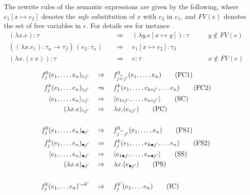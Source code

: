 \begin{definition}
The rewrite rules of the semantic expressions are given by the following, where $e_1[x \mapsto e_2]$ denotes the \emph{safe} substitution of $x$ with $e_2$ in $e_1$, and $\mathit{FV}(e)$ denotes the set of free variables in $e$. For details see for instance \cite{typedLambda}.
\begin{align}
 (\lambda x . e) : \tau &\quad \Rightarrow \quad (\lambda y . e[x \mapsto y]) : \tau
 \tag{$\alpha$} \quad\quad &y \not \in FV(e) \\
 ((\lambda x . e_1) : \tau_\alpha \to \tau_\beta) \, (e_2 : \tau_\alpha) &\quad \Rightarrow \quad e_1[x \mapsto e_2] : \tau_\beta
 \tag{$\beta$} \\
(\lambda x . (e \, x)) : \tau &\quad \Rightarrow \quad e : \tau
 \tag{$\eta$} \quad\quad &x \not \in FV(e) 
\end{align}

\begin{align}
f_j^0(e_1, \ldots, e_n)_{\circ j'} &\quad \Rightarrow \quad f_{j \widehat{+} j'}^0(e_1, \ldots, e_n)  \tag{FC1} \\
f_j^k(e_1, \ldots e_n)_{\circ j'} &\quad \Rightarrow \quad f_{j}^k(e_1, \ldots, e_{k \circ j'}, \ldots e_n )  \tag{FC2} \\
 \langle e_1, \ldots, e_n \rangle_{\circ j'} &\quad \Rightarrow \quad  \langle e_{1 \circ j'}, \ldots,  e_{n \circ j'} \rangle  \tag{SC} \\
 (\lambda x . e)_{\circ j'} &\quad \Rightarrow \quad 
 \lambda x . (e_{\circ j'})
 \tag{PC} \\
  & \notag \\
f_j^0(e_1, \ldots, e_n)_{\bullet j'} &\quad \Rightarrow \quad f_{j \widehat{\hspace{2.5pt} \cdot \hspace{2.5pt}} j'}^0(e_1, \ldots, e_n)  \tag{FS1} \\
f_j^k(e_1, \ldots e_n)_{\bullet j'} &\quad \Rightarrow \quad f_{j}^k(e_1, \ldots, e_{k \bullet j'}, \ldots e_n )  \tag{FS2} \\
 \langle e_1, \ldots, e_n \rangle_{\bullet j'} &\quad \Rightarrow \quad  \langle e_{1 \bullet j'}, \ldots,  e_{n \bullet j'} \rangle  \tag{SS} \\
(\lambda x . e)_{\bullet j'} &\quad \Rightarrow \quad 
 \lambda x . (e_{\bullet j'})
 \tag{PS} \\
 & \notag \\
 f_j^k(e_1, \ldots e_n)^{\leadsto k'} &\quad \Rightarrow \quad f_j^{k'}(e_1, \ldots e_n)
 \tag{IC} \\
\end{align}
\label{def:semanticExpressions2}
\done
\end{definition}
\vspace{-1em}

